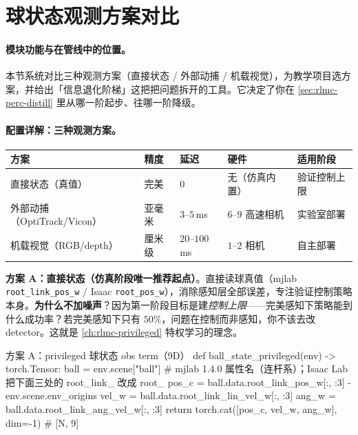 \section{球状态观测方案对比}
\label{sec:rlmc-perc-obs}

\paragraph{模块功能与在管线中的位置。}本节系统对比三种观测方案（直接状态 / 外部动捕 / 机载视觉），为教学项目选方案，并给出「信息退化阶梯」这把把问题拆开的工具。它决定了你在 \cref{sec:rlmc-perc-distill} 里从哪一阶起步、往哪一阶降级。

\paragraph{配置详解：三种观测方案。}

\begin{center}
\small
\begin{tabular}{@{}lllll@{}}
\toprule
方案 & 精度 & 延迟 & 硬件 & 适用阶段 \\
\midrule
直接状态（真值） & 完美 & $0$ & 无（仿真内置） & 验证控制上限 \\
外部动捕（OptiTrack/Vicon） & 亚毫米 & $3$--$5$\,ms & $6$--$9$ 高速相机 & 实验室部署 \\
机载视觉（RGB/depth） & 厘米级 & $20$--$100$\,ms & $1$--$2$ 相机 & 自主部署 \\
\bottomrule
\end{tabular}
\end{center}

\textbf{方案 A：直接状态（仿真阶段唯一推荐起点）}。直接读球真值（mjlab \verb|root_link_pos_w| / Isaac \verb|root_pos_w|），消除感知层全部误差，专注验证控制策略本身。\textbf{为什么不加噪声}？因为第一阶段目标是建\emph{控制上限}——完美感知下策略能到什么成功率？若完美感知下只有 $50\%$，问题在控制而非感知，你不该去改 detector。这就是 \cref{ch:rlmc-privileged} 特权学习的理念。

\begin{codebox}[Python]{方案 A：privileged 球状态 obs term（9D）}
def ball_state_privileged(env) -> torch.Tensor:
    ball = env.scene["ball"]
    # mjlab 1.4.0 属性名（连杆系）；Isaac Lab 把下面三处的 root_link_ 改成 root_
    pos_c = ball.data.root_link_pos_w[:, :3] - env.scene.env_origins
    vel_w = ball.data.root_link_lin_vel_w[:, :3]
    ang_w = ball.data.root_link_ang_vel_w[:, :3]
    return torch.cat([pos_c, vel_w, ang_w], dim=-1)        # [N, 9]
\end{codebox}

